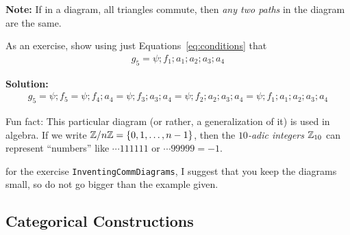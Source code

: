 \textbf{Note:} If in a diagram, all triangles commute, then \emph{any two paths} in the diagram are the same.

As an exercise, show using just Equations~\eqref{eq:conditions} that 
\begin{align*}
  g_5 = \psi;f_1;a_1;a_2;a_3;a_4
\end{align*}

\textbf{Solution:}
\begin{align*}
  g_5 = \psi;f_5 = \psi;f_4;a_4 = \psi;f_3;a_3;a_4
  = \psi;f_2;a_2;a_3;a_4
  = \psi;f_1;a_1;a_2;a_3;a_4
\end{align*}

Fun fact: This particular diagram (or rather, a generalization of it) is used in algebra.
If we write $\mathbb{Z}/n\mathbb{Z} = \{0,1,\ldots,n-1\}$, then the \emph{$10$-adic integers} $\mathbb{Z}_{10}$ can represent ``numbers'' like $\cdots 111111$ or $\cdots99999 = -1$.

for the exercise \texttt{InventingCommDiagrams}, I suggest that you keep the diagrams small, so do not go bigger than the example given.

\subsection{Categorical Constructions}
